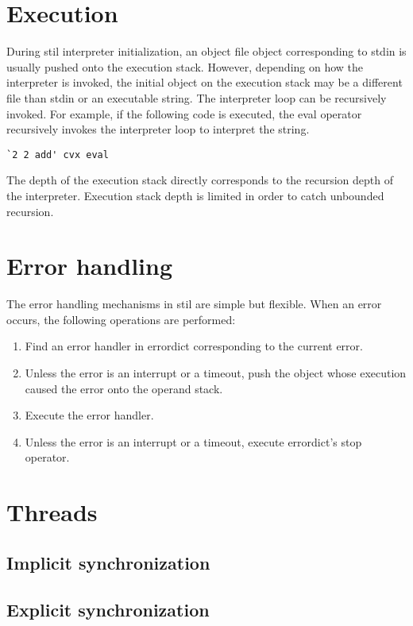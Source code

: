 \section{Execution}

During stil interpreter initialization, an object file object corresponding to
stdin is usually pushed onto the execution stack.  However, depending on how the
interpreter is invoked, the initial object on the execution stack may be a
different file than stdin or an executable string.  The interpreter loop can be
recursively invoked.  For example, if the following code is executed, the eval
operator recursively invokes the interpreter loop to interpret the string.
\begin{verbatim}
`2 2 add' cvx eval
\end{verbatim}

The depth of the execution stack directly corresponds to the recursion depth of
the interpreter.  Execution stack depth is limited in order to catch unbounded
recursion.

\section{Error handling}

The error handling mechanisms in stil are simple but flexible.  When an error
occurs, the following operations are performed:
\begin{enumerate}
\item{Find an error handler in errordict corresponding to the current error.}
\item{Unless the error is an interrupt or a timeout, push the object whose
execution caused the error onto the operand stack.}
\item{Execute the error handler.}
\item{Unless the error is an interrupt or a timeout, execute errordict's stop
operator.}
\end{enumerate}

\section{Threads}
\subsection{Implicit synchronization}
\subsection{Explicit synchronization}

